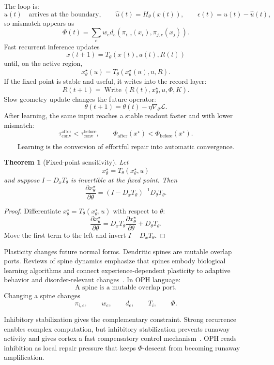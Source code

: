 \documentclass[11pt]{article}
\newtheorem{theorem}{Theorem}[section]
\theoremstyle{remark}
\theoremstyle{plain}
\begin{document}
The loop is:
\[
u(t)\quad\text{arrives at the boundary},
\qquad
\hat u(t)=H_\theta(x(t)),
\qquad
\epsilon(t)=u(t)-\hat u(t),
\]
so mismatch appears as
\[
\Phi(t)=
\sum_e w_e d_e(\pi_{i,e}(x_i),\pi_{j,e}(x_j)).
\]
Fast recurrent inference updates
\[
x(t+1)=T_\theta(x(t),u(t),R(t))
\]
until, on the active region,
\[
x^\star_\theta(u)=T_\theta(x^\star_\theta(u),u,R).
\]
If the fixed point is stable and useful, it writes into the record layer:
\[
R(t+1)=\operatorname{Write}(R(t),x^\star_\theta,u,\Phi,K).
\]
Slow geometry update changes the future operator:
\[
\theta(t+1)=\theta(t)-\eta\nabla_\theta\mathcal L.
\]
After learning, the same input reaches a stable readout faster and with lower mismatch:
\[
\tau_{\mathrm{conv}}^{\mathrm{after}}<
\tau_{\mathrm{conv}}^{\mathrm{before}},
\qquad
\Phi_{\mathrm{after}}(x^\star)<
\Phi_{\mathrm{before}}(x^\star).
\]

\[
\boxed{
\text{Learning is the conversion of effortful repair into automatic convergence.}
}
\]

\begin{theorem}[Fixed-point sensitivity]
Let
\[
x^\star_\theta=T_\theta(x^\star_\theta,u)
\]
and suppose \(I-D_xT_\theta\) is invertible at the fixed point. Then
\[
\boxed{
\frac{\partial x^\star_\theta}{\partial\theta}
=
(I-D_xT_\theta)^{-1}D_\theta T_\theta.
}
\]
\end{theorem}

\begin{proof}
Differentiate \(x^\star_\theta=T_\theta(x^\star_\theta,u)\) with respect to \(\theta\):
\[
\frac{\partial x^\star_\theta}{\partial\theta}
=
D_xT_\theta\frac{\partial x^\star_\theta}{\partial\theta}
+
D_\theta T_\theta.
\]
Move the first term to the left and invert \(I-D_xT_\theta\).
\end{proof}

Plasticity changes future normal forms. Dendritic spines are mutable overlap ports. Reviews of spine dynamics emphasize that spines embody biological learning algorithms and connect experience-dependent plasticity to adaptive behavior and disorder-relevant changes~\cite{Kasai2021}. In OPH language:
\[
\boxed{
\text{A spine is a mutable overlap port.}
}
\]
Changing a spine changes
\[
\pi_{i,e},\qquad w_e,\qquad d_e,\qquad T_i,\qquad \Phi.
\]

Inhibitory stabilization gives the complementary constraint. Strong recurrence enables complex computation, but inhibitory stabilization prevents runaway activity and gives cortex a fast compensatory control mechanism~\cite{SadehClopath2021}. OPH reads inhibition as local repair pressure that keeps \(\Phi\)-descent from becoming runaway amplification.
\end{document}

